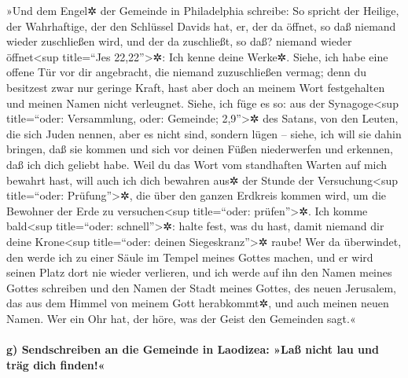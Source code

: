  »Und dem Engel✲ der Gemeinde in Philadelphia schreibe: So
spricht der Heilige, der Wahrhaftige, der den Schlüssel Davids hat, er,
der da öffnet, so daß niemand wieder zuschließen wird, und der da
zuschließt, so daß? niemand wieder öffnet\textless sup title=``Jes
22,22''\textgreater✲:  Ich kenne deine Werke✲. Siehe, ich
habe eine offene Tür vor dir angebracht, die niemand zuzuschließen
vermag; denn du besitzest zwar nur geringe Kraft, hast aber doch an
meinem Wort festgehalten und meinen Namen nicht verleugnet.
 Siehe, ich füge es so: aus der Synagoge\textless sup
title=``oder: Versammlung, oder: Gemeinde; 2,9''\textgreater✲ des
Satans, von den Leuten, die sich Juden nennen, aber es nicht sind,
sondern lügen -- siehe, ich will sie dahin bringen, daß sie kommen und
sich vor deinen Füßen niederwerfen und erkennen, daß ich dich geliebt
habe.  Weil du das Wort vom standhaften Warten auf mich
bewahrt hast, will auch ich dich bewahren aus✲ der Stunde der
Versuchung\textless sup title=``oder: Prüfung''\textgreater✲, die über
den ganzen Erdkreis kommen wird, um die Bewohner der Erde zu
versuchen\textless sup title=``oder: prüfen''\textgreater✲.
 Ich komme bald\textless sup title=``oder:
schnell''\textgreater✲: halte fest, was du hast, damit niemand dir deine
Krone\textless sup title=``oder: deinen Siegeskranz''\textgreater✲
raube!  Wer da überwindet, den werde ich zu einer Säule
im Tempel meines Gottes machen, und er wird seinen Platz dort nie wieder
verlieren, und ich werde auf ihn den Namen meines Gottes schreiben und
den Namen der Stadt meines Gottes, des neuen Jerusalem, das aus dem
Himmel von meinem Gott herabkommt✲, und auch meinen neuen Namen.
 Wer ein Ohr hat, der höre, was der Geist den Gemeinden
sagt.«

\hypertarget{g-sendschreiben-an-die-gemeinde-in-laodizea-lauxdf-nicht-lau-und-truxe4g-dich-finden}{%
\paragraph{g) Sendschreiben an die Gemeinde in Laodizea: »Laß nicht lau
und träg dich
finden!«}\label{g-sendschreiben-an-die-gemeinde-in-laodizea-lauxdf-nicht-lau-und-truxe4g-dich-finden}}

